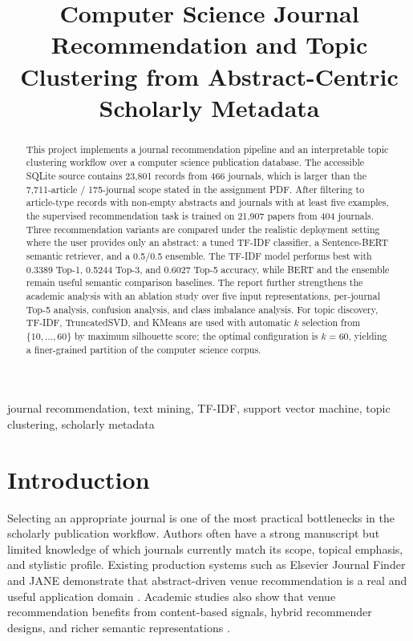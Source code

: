 \documentclass[conference]{IEEEtran}
\title{Computer Science Journal Recommendation and Topic Clustering from Abstract-Centric Scholarly Metadata}
\author{
\IEEEauthorblockN{Student Project Draft}
\IEEEauthorblockA{Data Mining Final Project\\
Computer Science Journal Recommendation}
}
\begin{document}
\maketitle

\begin{abstract}
This project implements a journal recommendation pipeline and an interpretable topic clustering workflow over a computer science publication database. The accessible SQLite source contains 23{,}801 records from 466 journals, which is larger than the 7{,}711-article / 175-journal scope stated in the assignment PDF. After filtering to article-type records with non-empty abstracts and journals with at least five examples, the supervised recommendation task is trained on 21{,}907 papers from 404 journals. Three recommendation variants are compared under the realistic deployment setting where the user provides only an abstract: a tuned TF-IDF classifier, a Sentence-BERT semantic retriever, and a 0.5/0.5 ensemble. The TF-IDF model performs best with 0.3389 Top-1, 0.5244 Top-3, and 0.6027 Top-5 accuracy, while BERT and the ensemble remain useful semantic comparison baselines. The report further strengthens the academic analysis with an ablation study over five input representations, per-journal Top-5 analysis, confusion analysis, and class imbalance analysis. For topic discovery, TF-IDF, TruncatedSVD, and KMeans are used with automatic $k$ selection from $\{10,\dots,60\}$ by maximum silhouette score; the optimal configuration is $k=60$, yielding a finer-grained partition of the computer science corpus.
\end{abstract}

\begin{IEEEkeywords}
journal recommendation, text mining, TF-IDF, support vector machine, topic clustering, scholarly metadata
\end{IEEEkeywords}

\section{Introduction}
Selecting an appropriate journal is one of the most practical bottlenecks in the scholarly publication workflow. Authors often have a strong manuscript but limited knowledge of which journals currently match its scope, topical emphasis, and stylistic profile. Existing production systems such as Elsevier Journal Finder and JANE demonstrate that abstract-driven venue recommendation is a real and useful application domain \cite{kang2015elsevier,jane2007website}. Academic studies also show that venue recommendation benefits from content-based signals, hybrid recommender designs, and richer semantic representations \cite{alhoori2017dynamic,pradhan2020hasvrec,liu2022embedding}.
\end{document}
